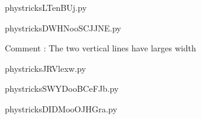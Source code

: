     

    \clearpage
    


    \newcommand{\CaptionFigLTenBUj}{<+Type your caption here+>}
    \begin{center}
        
    \end{center}
    phystricksLTenBUj.py

    

    \clearpage
    


    \newcommand{\CaptionFigDWHNooSCJJNE}{<+Type your caption here+>}
    \begin{center}
        
    \end{center}
    phystricksDWHNooSCJJNE.py

    Comment : The two vertical lines have larges width

    \clearpage
    


    \newcommand{\CaptionFigJRVlexw}{<+Type your caption here+>}
    \begin{center}
        
    \end{center}
    phystricksJRVlexw.py

    

    \clearpage
    


    \newcommand{\CaptionFigSWYDooBCeFJb}{<+Type your caption here+>}
    \begin{center}
        
    \end{center}
    phystricksSWYDooBCeFJb.py

    

    \clearpage
    


    \newcommand{\CaptionFigDIDMooOJHGra}{<+Type your caption here+>}
    \begin{center}
        
    \end{center}
    phystricksDIDMooOJHGra.py

    

    \clearpage
    


